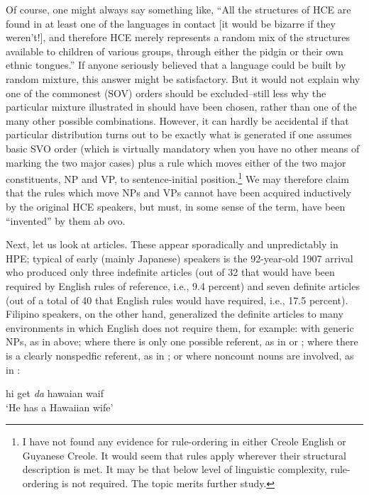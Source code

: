 Of course, one might always say something like, ``All the struc\-tures of HCE are found in at least one of the languages in contact [it would be bizarre if they weren't!], and therefore HCE merely repre\-sents a random mix of the structures available to children of various groups, through either the pidgin or their own ethnic tongues.'' If anyone seriously believed that a language could be built by random mixture, this answer might be satisfactory. But it would not explain why one of the commonest (SOV) orders should be excluded--still less why the particular mixture illustrated in  should have been chosen, rather than one of the many other possible combinations. However, it can hardly be accidental if that particular distribution turns out to be exactly what is generated if one assumes basic SVO order (which is virtually mandatory when you have no other means of mark\-ing the two major cases) plus a rule which moves either of the two
major constituents, NP and VP, to sentence-initial position.\footnote{I have not found any evidence for rule-ordering in either Creole English or Guyanese Creole. It would seem that rules apply wherever their structural description is met. It may be that below level of linguistic complexity, rule-ordering is not required. The topic merits further study.} We may therefore claim that the rules which move NPs and VPs cannot have been acquired inductively by the original HCE speakers, but must, in some sense of the term, have been ``invented'' by them ab ovo.

Next, let us look at articles. These appear sporadically and unpredictably in HPE; typical of early (mainly Japanese) speakers is the 92-year-old 1907 arrival who produced only three indefinite articles (out of 32 that would have been required by English rules of reference, i.e., 9.4 percent) and seven definite articles (out of a total of 40 that English rules would have required, i.e., 17.5 percent). Filipino speakers, on the other hand, generalized the definite articles to many environ\-ments in which English does not require them, for example: with generic NPs, as in  above; where there is only one possible refer\-ent, as in  or ; where there is a clearly nonspedfic referent, as in ; or where noncount nouns are involved, as in :

\ea\label{ex:30}
 hi get \textit{da} hawaian waif \\
\glt  `He has a Hawaiian wife'
\z

